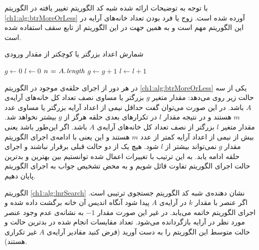{با توجه به توضیحات ارائه ‌شده شبه کد الگوریتم تغییر یافته در الگوریتم {\eqref{ch1:alg:btrMoreOrLess}} آورده شده است. زوج یا فرد بودن تعداد خانه‌های آرایه در این الگوریتم مهم است و به همین جهت در این الگوریتم از تابع سقف استفاده شده است.

\begin{algorithm}[t]
\caption{شمارش اعداد بزرگتر یا کوچکتر از مقدار ورودی}
\label{ch1:alg:btrMoreOrLess}
\begin{latin}
\begin{algorithmic}[1]
	\State $g \gets 0$
	\State $l \gets 0$
	\State $n \mathrel{\hspace{1pt}=\hspace{1pt}} A.\hspace*{1pt}\mathit{length}$
%
					\State	$g \gets g+1$			
			\Else
					\State $l \gets l+1$
			\EndIf			
					\State \Return {}
					\State \Return {}
			\EndIf		
	\EndFor
			\State \Return {}
	\Else
			\State \Return {}
	\EndIf
\EndFunction		 	
\end{algorithmic}
\end{latin}
\end{algorithm}

 در هر دور از اجرای حلقه‌ی موجود در الگوریتم {\eqref{ch1:alg:btrMoreOrLess}} یکی از سه حالت زیر روی می‌دهد:
 مقدار متغیر {$g$} بزرگتر یا مساوی نصف تعداد کل خانه‌های آرایه‌ی {$A$} باشد. در این صورت می‌توان گفت حداقل نیمی از اعداد آرایه بزرگتر یا مساوی عدد {$m$} هستند و در نتیجه مقدار {$l$} در تکرارهای بعدی حلقه هرگز از {$g$} بیشتر نخواهد شد.
 مقدار متغیر {$l$} بزرگتر از نصف تعداد کل خانه‌های آرایه‌ی {$A$} باشد. اگر این‌طور باشد یعنی بیش از نیمی از اعداد آرایه کمتر از عدد {$m$} هستند و این یعنی با ادامه‌ی اجرای الگوریتم مقدار {$g$} نمی‌تواند بیشتر از {$l$} شود.
 هیچ یک از دو حالت قبلی برقرار نباشند و اجرای حلقه ادامه یابد.
به این ترتیب با تغییرات اعمال ‌شده توانستیم بین بهترین و بدترین حالت اجرای الگوریتم تفاوت قائل ‌شویم و به محض تشخیص جواب به اجرای الگوریتم پایان دهیم.

 الگوریتم {\eqref{ch1:alg:lnrSearch}} نشان دهنده‌ی شبه کد الگوریتم جستجوی ترتیبی است. اگر عنصر با مقدار {$k$} در آرایه‌ی {$A$} پیدا شود آنگاه اندیس آن خانه برگشت داده شده و اجرای الگوریتم خاتمه می‌یابد. در غیر این صورت مقدار {$-1$} به نشانه‌ی عدم وجود عنصر مورد نظر در آرایه بازگردانده می‌شود. تعداد مقایسات انجام ‌شده در بدترین حالت و حالت متوسط این الگوریتم را به دست آورید (فرض کنید مقادیر آرایه‌ی {$A$} غیر تکراری هستند).

}
